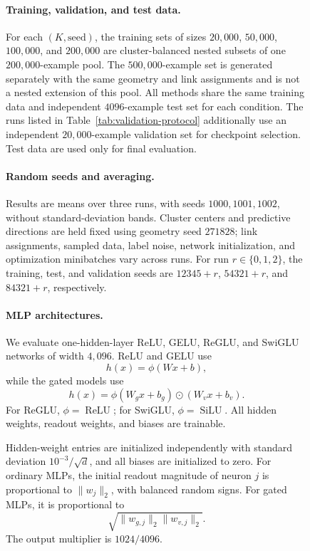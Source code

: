\documentclass{article}
\newcounter{model}[section]
\newcounter{initialization}[section]
\begin{document}
\begin{figure}
\paragraph{Training, validation, and test data.}
For each \((K,\text{seed})\), the training sets of sizes
\(20{,}000\), \(50{,}000\), \(100{,}000\), and \(200{,}000\) are
cluster-balanced nested subsets of one \(200{,}000\)-example pool.
The \(500{,}000\)-example set is generated separately with the same
geometry and link assignments and is not a nested extension of this pool.
All methods share the same training data and independent \(4096\)-example
test set for each condition. The runs listed in
Table~\ref{tab:validation-protocol} additionally use an independent
\(20{,}000\)-example validation set for checkpoint selection.
Test data are used only for final evaluation.

\paragraph{Random seeds and averaging.}
Results are means over three runs, with seeds \(1000,1001,1002\), without
standard-deviation bands. Cluster centers and predictive directions are
held fixed using geometry seed \(271828\); link assignments, sampled data,
label noise, network initialization, and optimization minibatches vary
across runs. For run \(r\in\{0,1,2\}\), the training, test, and validation
seeds are \(12345+r\), \(54321+r\), and \(84321+r\), respectively.

\paragraph{MLP architectures.}
We evaluate one-hidden-layer ReLU, GELU, ReGLU, and SwiGLU networks of width
\(4{,}096\). ReLU and GELU use
\[
    h(x)=\phi(Wx+b),
\]
while the gated models use
\[
    h(x)
    =
    \phi(W_gx+b_g)\odot(W_vx+b_v).
\]
For ReGLU, \(\phi=\operatorname{ReLU}\); for SwiGLU,
\(\phi=\operatorname{SiLU}\). All hidden weights, readout weights, and biases
are trainable.

Hidden-weight entries are initialized independently with standard deviation
\(10^{-3}/\sqrt d\), and all biases are initialized to zero. For ordinary
MLPs, the initial readout magnitude of neuron \(j\) is proportional to
\(\|w_j\|_2\), with balanced random signs. For gated MLPs, it is proportional
to
\[
    \sqrt{\|w_{g,j}\|_2\|w_{v,j}\|_2}.
\]
The output multiplier is \(1024/4096\).



\end{figure}
\end{document}
